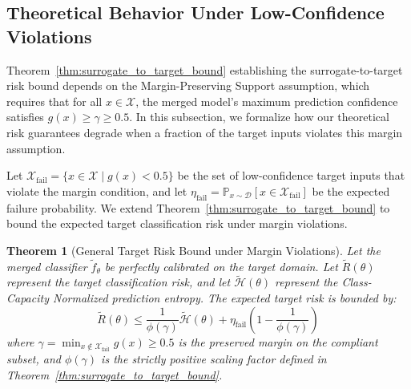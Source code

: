 \documentclass{article}
\theoremstyle{plain}
\newtheorem{theorem}{Theorem}[section]
\theoremstyle{definition}
\theoremstyle{remark}
\begin{document}
\subsection{Theoretical Behavior Under Low-Confidence Violations}
\label{subsec:low_confidence_violations}

Theorem~\ref{thm:surrogate_to_target_bound} establishing the surrogate-to-target risk bound depends on the Margin-Preserving Support assumption, which requires that for all $x \in \mathcal{X}$, the merged model's maximum prediction confidence satisfies $g(x) \ge \gamma \ge 0.5$. In this subsection, we formalize how our theoretical risk guarantees degrade when a fraction of the target inputs violates this margin assumption.

Let $\mathcal{X}_{\text{fail}} = \{x \in \mathcal{X} \mid g(x) < 0.5\}$ be the set of low-confidence target inputs that violate the margin condition, and let $\eta_{\text{fail}} = \mathbb{P}_{x \sim \mathcal{D}}[x \in \mathcal{X}_{\text{fail}}]$ be the expected failure probability. We extend Theorem~\ref{thm:surrogate_to_target_bound} to bound the expected target classification risk under margin violations.

\begin{theorem}[General Target Risk Bound under Margin Violations]
Let the merged classifier $\tilde{f}_{\theta}$ be perfectly calibrated on the target domain. Let $\tilde{R}(\theta)$ represent the target classification risk, and let $\tilde{\mathcal{H}}(\theta)$ represent the Class-Capacity Normalized prediction entropy. The expected target risk is bounded by:
\begin{equation}
\tilde{R}(\theta) \le \frac{1}{\phi(\gamma)} \tilde{\mathcal{H}}(\theta) + \eta_{\text{fail}} \left( 1 - \frac{1}{\phi(\gamma)} \right)
\end{equation}
where $\gamma = \min_{x \notin \mathcal{X}_{\text{fail}}} g(x) \ge 0.5$ is the preserved margin on the compliant subset, and $\phi(\gamma)$ is the strictly positive scaling factor defined in Theorem~\ref{thm:surrogate_to_target_bound}.
\end{theorem}
\end{document}
